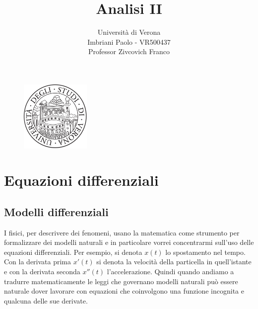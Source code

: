 \documentclass[a4paper]{article}
\title{Analisi II}
\author{Università di Verona\\Imbriani Paolo - VR500437\\Professor Zivcovich Franco}
\numberwithin{equation}{subsection}
\begin{document}
\pagestyle{fancy}

\fancyhead{} %
\fancyfoot{} %
\fancyfoot[LE,RO]{\thepage}

\begin{figure}
    \centering
    \includegraphics[width=0.3\textwidth]{../UniversityofVerona.png}
\end{figure}


\maketitle 

\pagebreak

\tableofcontents

\pagebreak


\section{Equazioni differenziali}

\subsection{Modelli differenziali}

I fisici, per descrivere dei fenomeni, usano la matematica come strumento per formalizzare dei modelli naturali e in particolare vorrei concentrarmi sull'uso delle equazioni differenziali. 
Per esempio, si denota $x(t)$ lo spostamento nel tempo.
Con la derivata prima $x'(t)$ si denota la velocità della particella in quell'istante e con la derivata seconda $x''(t)$ l'accelerazione.
Quindi quando andiamo a tradurre
matematicamente le leggi che governano modelli naturali può essere naturale dover lavorare
con equazioni che coinvolgono una funzione incognita e qualcuna delle sue derivate.
\end{document}
